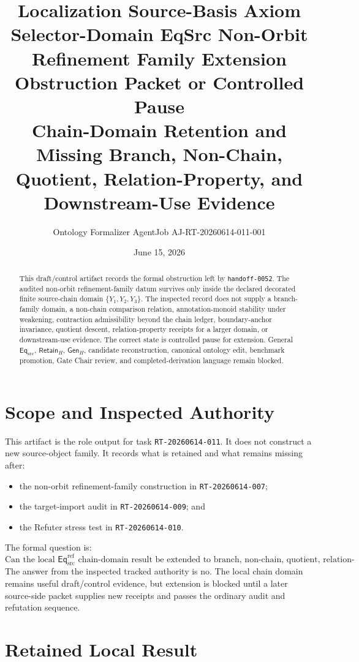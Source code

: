 \documentclass[11pt]{article}
\title{\textbf{Localization Source-Basis Axiom Selector-Domain EqSrc Non-Orbit Refinement Family Extension Obstruction Packet or Controlled Pause}\\[0.35em]
\large Chain-Domain Retention and Missing Branch, Non-Chain, Quotient, Relation-Property, and Downstream-Use Evidence}
\author{Ontology Formalizer AgentJob AJ-RT-20260614-011-001}
\date{June 15, 2026}
\newcommand{\EqSrc}{\mathsf{Eq}_{\mathrm{src}}}
\newcommand{\EqRef}{\mathsf{Eq}_{\mathrm{src}}^{\mathrm{ref}}}
\newcommand{\RetainH}{\mathsf{Retain}_{H}}
\newcommand{\GenH}{\mathsf{Gen}_{H}}
\begin{document}
\maketitle

\begin{abstract}
This draft/control artifact records the formal obstruction left by
\texttt{handoff-0052}. The audited non-orbit refinement-family datum
survives only inside the declared decorated finite source-chain domain
\(\{Y_{1},Y_{2},Y_{3}\}\). The inspected record does not supply a
branch-family domain, a non-chain comparison relation, annotation-monoid
stability under weakening, contraction admissibility beyond the chain
ledger, boundary-anchor invariance, quotient descent, relation-property
receipts for a larger domain, or downstream-use evidence. The correct
state is controlled pause for extension. General \(\EqSrc\),
\(\RetainH\), \(\GenH\), candidate reconstruction, canonical ontology
edit, benchmark promotion, Gate Chair review, and completed-derivation
language remain blocked.
\end{abstract}

\section{Scope and Inspected Authority}

This artifact is the role output for task \texttt{RT-20260614-011}. It
does not construct a new source-object family. It records what is retained
and what remains missing after:
\begin{itemize}
    \item the non-orbit refinement-family construction in
    \texttt{RT-20260614-007};
    \item the target-import audit in \texttt{RT-20260614-009}; and
    \item the Refuter stress test in \texttt{RT-20260614-010}.
\end{itemize}

The formal question is:
\[
    \text{Can the local }\EqRef\text{ chain-domain result be extended to
    branch, non-chain, quotient, relation-property, or downstream use?}
\]
The answer from the inspected tracked authority is no. The local chain
domain remains useful draft/control evidence, but extension is blocked
until a later source-side packet supplies new receipts and passes the
ordinary audit and refutation sequence.

\section{Retained Local Result}
\end{document}
